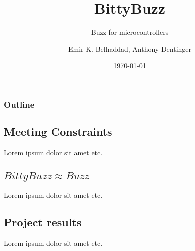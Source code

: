 \documentclass{beamer}
\title{BittyBuzz}
\subtitle{Buzz for microcontrollers}
\author{Emir K. Belhaddad, Anthony Dentinger}
\date{\today}
\begin{document}
	\begin{frame}
		\titlepage
	\end{frame}
	\begin{frame}
		\frametitle{Outline}
		\tableofcontents
	\end{frame}
	\begin{frame}
		\section{Meeting Constraints}
		Lorem ipsum dolor sit amet etc.
	\end{frame}
	\begin{frame}
		\section{$BittyBuzz \approx Buzz$}
		Lorem ipsum dolor sit amet etc.
	\end{frame}
	\begin{frame}
		\section{Project results}
		Lorem ipsum dolor sit amet etc.
	\end{frame}
\end{document}
